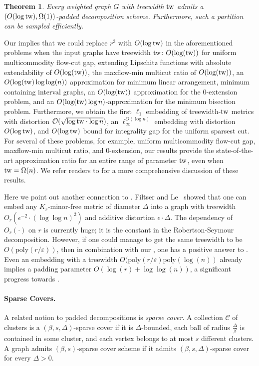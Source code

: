 \documentclass{article}
\newtheorem{theorem}{Theorem}\newtheorem{lemma}[theorem]{Lemma}\newtheorem{proposition}[theorem]{Proposition}\newtheorem{corollary}[theorem]{Corollary}\newtheorem{definition}[theorem]{Definition}\newtheorem{claim}[theorem]{Claim}\newtheorem{remark}[theorem]{Remark}\newtheorem{observation}[theorem]{Observation}\newtheorem{conjecture}[theorem]{Conjecture}\newtheorem{example}[theorem]{Example}
\newcommand{\tw}{{\rm tw}}
\newcommand{\poly}{\mathrm{poly}}
\def\eps{\varepsilon}
\begin{document}
\begin{theorem}\label{thm:paddedTW}
	Every weighted graph $G$ with treewidth $\tw$ admits a  $\left(O( \log\tw),\Omega(1)\right)$-padded decomposition scheme. Furthermore, such a partition can be sampled efficiently.
\end{theorem}	




Our  implies that we could replace $r^3$ with $O(\log \tw)$ in the aforementioned problems when the input graphs have treewidth $\tw$: $O(\log(\tw))$ for uniform multicommodity flow-cut gap, extending Lipschitz functions with absolute extendability of $O(\log(\tw))$,  the maxflow-min multicut ratio of $O(\log(\tw))$, an $O(\log(\tw) \log\log(n))$ approximation for minimum linear arrangement,  minimum containing interval graphs, an $O(\log(\tw))$ approximation for the 0-extension problem,  and an $O(\log(\tw)\log n)$-approximation for the minimum bisection problem. Furthermore, we obtain  the first $\ell_1$ embedding of treewidth-$\tw$ metrics with distortion $\mathcal{O}(\sqrt{\log \tw \cdot \log n})$, an $\ell^{O(\log n)}_\infty$ embedding with distortion $O(\log \tw)$, and $O(\log \tw)$ bound for integrality gap for the uniform sparsest cut.  For several of these problems, for example, uniform multicommodity flow-cut gap, maxflow-min multicut ratio, and 0-extension, our results provide the state-of-the-art approximation ratio for an entire range of parameter $\tw$, even when $\tw = \Omega(n)$.  We refer readers to  for a more comprehensive discussion of these results. 

Here we point out another connection to . Filtser and Le~\cite{FL22} showed that one can embed any $K_r$-minor-free metric of diameter $\Delta$ into a graph with treewidth $O_r(\epsilon^{-2}\cdot(\log\log n)^2)$ and additive distortion $\epsilon\cdot \Delta$. The dependency of $O_r(\cdot)$ on $r$ is currently huge; it is the constant in the Robertson-Seymour decomposition. However, if one could manage to get the same treewidth to be $O(\poly(r/\eps))$, then in combination with our , one has a positive answer to . Even an embedding with a treewidth $O(\poly(r/\eps)\poly(\log(n))$ already implies a padding parameter $O(\log(r) + \log\log(n))$, a significant progress towards . 

\paragraph*{Sparse Covers.~}
A related notion to padded decompositions is \emph{sparse cover}.
A collection $\mathcal{C}$ of clusters is a $(\beta,s,\Delta)$-sparse cover if it is $\Delta$-bounded, each ball of radius $\frac\Delta\beta$ is contained in some cluster, and each vertex belongs to at most $s$ different clusters. 
A graph admits $(\beta,s)$-sparse cover scheme if it admits $(\beta,s,\Delta)$-sparse cover for every $\Delta>0$.
\end{document}
